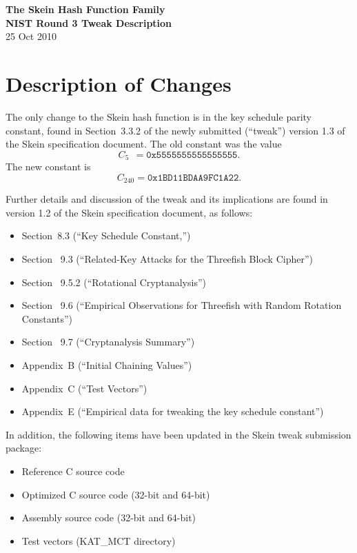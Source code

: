 \documentclass[11pt,twoside]{article}
\begin{document}
\thispagestyle{empty}
\begin{center}
{\Large\bf The Skein Hash Function Family} \\
\vspace*{.2in}
{\Large\bf NIST Round 3 Tweak Description} \\
\vspace*{.2in}
{\small 25 Oct 2010}
\end{center}

\section*{Description of Changes}

The only change to the Skein hash function is in the key schedule
parity constant, found in Section~3.3.2 of the newly submitted 
(``tweak'') version 1.3 of the Skein specification document. The
old constant was the value 
  $$C_5\ \  = \texttt{0x5555555555555555}.$$ 
The new constant is 
  $$C_{240} = \texttt{0x1BD11BDAA9FC1A22}.$$

Further details and discussion of the tweak and its implications are found in 
version 1.2 of the Skein specification document, as follows:
\begin{itemize}
\item Section~8.3 (``Key Schedule Constant,'')
\item Section ~9.3 (``Related-Key Attacks for the Threefish Block Cipher'')
\item Section ~9.5.2 (``Rotational Cryptanalysis'')
\item Section ~9.6 (``Empirical Observations for Threefish with Random Rotation Constants'')
\item Section ~9.7 (``Cryptanalysis Summary'')
\item Appendix~B (``Initial Chaining Values'')
\item Appendix~C (``Test Vectors'')
\item Appendix~E (``Empirical data for tweaking the key schedule constant'')
\end{itemize}

In addition, the following items have been updated in the Skein tweak submission package:
\begin{itemize}
\item Reference C source code
\item Optimized C source code (32-bit and 64-bit)
\item Assembly source code (32-bit and 64-bit)
\item Test vectors (KAT\_MCT directory)
\end{itemize}
\end{document}
